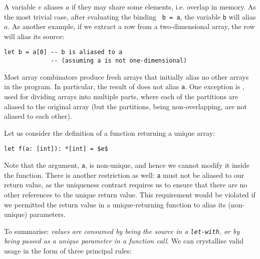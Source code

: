 \documentclass[oneside,11pt]{book}
\begin{document}
A variable $v$ aliases $a$ if they may share some elements,
i.e. overlap in memory.  As the most trivial case, after evaluating
the binding \texttt{ b = a}, the variable \texttt{b} will alias
\texttt{$a$}.  As another example, if we extract a row from a
two-dimensional array, the row will alias its source:

\begin{lstlisting}
let b = a[0] -- b is aliased to a
             -- (assuming a is not one-dimensional)
\end{lstlisting}

\noindent
Most array combinators produce fresh arrays that initially alias no
other arrays in the program.  In particular, the result of  does not alias \texttt{a}.  One exception is ,
used for dividing arrays into multiple parts, where each of the
partitions are aliased to the original array (but the partitions,
being non-overlapping, are not aliased to each other).

Let us consider the definition of a function returning a unique array:

\begin{lstlisting}[mathescape=true]
let f(a: [int]): *[int] = $e$
\end{lstlisting}

Note that the argument, \texttt{a}, is non-unique, and hence we cannot
modify it inside the function.  There is another restriction as well:
\texttt{a} must not be aliased to our return value, as the uniqueness
contract requires us to ensure that there are no other references to
the unique return value.  This requirement would be violated if we
permitted the return value in a unique-returning function to alias its
(non-unique) parameters.

To summarise: \textit{values are consumed by being the source in a
  \texttt{let-with}, or by being passed as a \textit{unique} parameter
  in a function call}.  We can crystallise valid usage in the form of
three principal rules:
\end{document}
